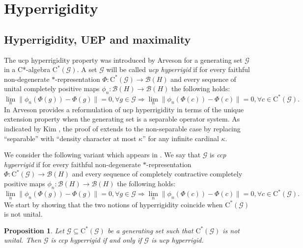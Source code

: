 \documentclass[11pt, draft]{amsart}
\numberwithin{equation}{section}
\theoremstyle{plain}
\newtheorem{proposition}[theorem]{Proposition}
\theoremstyle{definition}
\theoremstyle{remark}
\newcommand{\B}{{\mathcal{B}}}
\newcommand{\G}{{\mathcal{G}}}
\newcommand{\ca}{\mathrm{C}^*}
\begin{document}
\section{Hyperrigidity} \label{S:hyper}

\subsection{Hyperrigidity, UEP and maximality}

The ucp hyperrigidity property was introduced by Arveson \cite{Arv11} for a generating set $\G$ in a C*-algebra $\ca(\G)$.
A set $\G$ will be called \emph{ucp hyperrigid} if for every faithful non-degenerate $*$-representation $\Phi \colon \ca(\G) \to \B(H)$ and every sequence of unital completely positive maps $\phi_n \colon \B(H) \to \B(H)$ the following holds:
\[
\lim_n \|\phi_n(\Phi(g)) - \Phi(g)\|=0, \forall g \in \G
\Rightarrow
\lim_n \|\phi_n(\Phi(c)) - \Phi(c)\| = 0, \forall c \in \ca(\G).
\]
In \cite[Theorem 2.1]{Arv11} Arveson provides a reformulation of ucp hyperrigidity in terms of the unique extension property when the generating set is a separable operator system.
As indicated by Kim \cite[page 4]{Kim21}, the proof of \cite[Theorem 2.1]{Arv11} extends to the non-separable case by replacing ``separable'' with ``density character at most $\kappa$'' for any infinite cardinal $\kappa$.

We consider the following variant which appears in \cite[Lemma 2.7]{Sal17}.
We say that $\G$ is \emph{ccp hyperrigid} if for every faithful non-degenerate $*$-representation $\Phi \colon \ca(\G) \to \B(H)$ and every sequence of completely contractive completely positive maps $\phi_n \colon \B(H) \to \B(H)$ the following holds:
\[
\lim_n \|\phi_n(\Phi(g)) - \Phi(g)\|=0, \forall g \in \G
\Rightarrow
\lim_n \|\phi_n(\Phi(c)) - \Phi(c)\| = 0, \forall c \in \ca(\G).
\]
We start by showing that the two notions of hyperrigidity coincide when $\ca(\G)$ is not unital.

\begin{proposition} \label{P:ccp/ucp}
Let $\G\subseteq\ca(\G)$ be a generating set such that $\ca(\G)$ is not unital.
Then $\G$ is ccp hyperrigid if and only if $\G$ is ucp hyperrigid.
\end{proposition}
\end{document}
